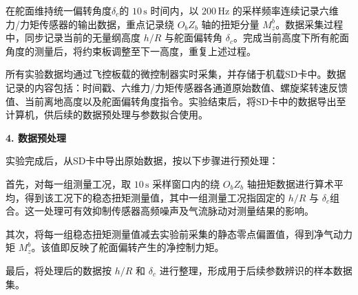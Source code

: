 在舵面维持统一偏转角度$\delta_c$的 $10\,\mathrm{s}$ 时间内，以 $200\,\mathrm{Hz}$ 的采样频率连续记录六维力/力矩传感器的输出数据，重点记录绕 $O_bZ_b$ 轴的扭矩分量 $M_{z}^b$。数据采集过程中，同步记录当前的无量纲高度 $h/R$ 与舵面偏转角 $\delta_c$。完成当前高度下所有舵面角度的测量后，将约束板调整至下一高度，重复上述过程。

所有实验数据均通过飞控板载的微控制器实时采集，并存储于机载SD卡中。数据记录的内容包括：时间戳、六维力/力矩传感器各通道原始数值、螺旋桨转速反馈值、当前离地高度以及舵面偏转角度指令。实验结束后，将SD卡中的数据导出至计算机，供后续的数据预处理与参数拟合使用。

\textbf{4. 数据预处理}

实验完成后，从SD卡中导出原始数据，按以下步骤进行预处理：

首先，对每一组测量工况，取 $10\,\mathrm{s}$ 采样窗口内的绕 $O_bZ_b$ 轴扭矩数据进行算术平均，得到该工况下的稳态扭矩测量值，其中一组测量工况指固定的 $h/R$ 与 $\delta_c$组合。这一处理可有效抑制传感器高频噪声及气流脉动对测量结果的影响。

其次，将每一组稳态扭矩测量值减去实验前采集的静态零点偏置值，得到净气动力矩 $M_{z}^b$。该值即反映了舵面偏转产生的净控制力矩。

最后，将处理后的数据按 $h/R$ 和 $\delta_c$ 进行整理，形成用于后续参数辨识的样本数据集。





